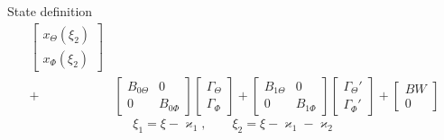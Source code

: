 \documentclass{beamer}
\begin{document}
\begin{frame}{State definition}
\begin{align*}
\begin{bmatrix}
								x_\Theta(\xi_2) \\
								x_\Phi(\xi_2)
								\end{bmatrix} \nonumber\\
								+&
								\begin{bmatrix}
								B_{0\Theta} & 0\\
								0 & \boxed{B_{0\Phi}}
								\end{bmatrix} 
								\begin{bmatrix}
								\Gamma_\Theta \\
								\Gamma_\Phi
								\end{bmatrix} +
								\begin{bmatrix}
								B_{1\Theta} & 0\\
								0 & \boxed{B_{1\Phi}}
								\end{bmatrix} 
								\begin{bmatrix}
								\Gamma_\Theta' \\
								\Gamma_\Phi'
								\end{bmatrix} + 
								\begin{bmatrix}
								BW \\
								0
								\end{bmatrix}
								\end{align*}
								\begin{equation*}
									\xi_1 = \xi - \varkappa_1, \qquad \xi_2 = \xi - \varkappa_1 - \varkappa_2
								\end{equation*}
\end{frame}
\end{document}
